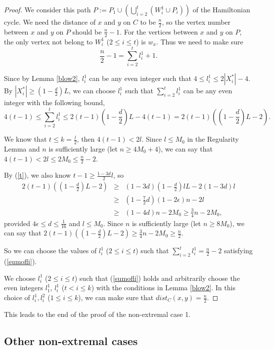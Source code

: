 \documentclass[11pt]{article}
\begin{document}
\begin{proof}
We consider this path $P:=P_1\cup (\bigcup_{i=2}^t (W_i^1\cup P_i))$ of the Hamiltonian cycle. We need the distance of $x$ and $y$ on $C$ to be $\frac{n}{2}$, so the vertex number between $x$ and $y$ on $P$ should be $\frac{n}{2}-1$. For the vertices between $x$ and $y$ on $P$, the only vertex not belong to $W_i^1$ ($2\leq i\leq t$) is $w_x$. Thus we need to make sure
\begin{equation}\label{sumofli}
\frac{n}{2}-1=\sum\limits_{i=2}^{t}l_i^1+1.
\end{equation}

Since by Lemma \ref{blow2}, $l_i^1$ can be any even integer such that $4\leq l_i^1\leq 2|X_i^*|-4$. By $|X_i^*|\geq (1-\frac{d}{2})L$, we can choose $l_i^1$ such that $\sum\limits_{i=2}^{t}l_i^1$ can be any even integer with the following bound,
$$4(t-1)\leq \sum\limits_{i=2}^{t}l_i^1\leq 2(t-1)(1-\frac{d}{2})L-4(t-1)=2(t-1)((1-\frac{d}{2})L-2).$$

We know that $t\leq k=\frac{l}{2}$, then $4(t-1)<2l$. Since $l\leq M_0$ in the Regularity Lemma and $n$ is sufficiently large (let $n\geq 4M_0+4$), we can say that $4(t-1)<2l\leq 2M_0\leq \frac{n}{2}-2$.

By (\ref{t}), we also know $t-1\geq \frac{1-3d}{2}l$, so
\begin{eqnarray*}
2(t-1)((1-\frac{d}{2})L-2)&\geq &(1-3d)(1-\frac{d}{2})lL-2(1-3d)l\\ &\geq &(1-\frac{7}{2}d)(1-2\epsilon )n-2l\\ &\geq &(1-4d)n-2M_0\geq \frac{3}{4}n-2M_0,
\end{eqnarray*}
provided $4\epsilon \leq d\leq \frac{1}{16}$ and $l\leq M_0$. Since $n$ is sufficiently large (let $n\geq 8M_0$), we can say that $2(t-1)((1-\frac{d}{2})L-2)\geq \frac{3}{4}n-2M_0\geq \frac{n}{2}$.

So we can choose the values of $l_i^1$ ($2\leq i\leq t$) such that $\sum\limits_{i=2}^{t}l_i^1=\frac{n}{2}-2$ satisfying (\ref{sumofli}).

We choose $l_i^1$ ($2\leq i\leq t$) such that (\ref{sumofli}) holds and arbitrarily choose the even integers  $l_1^1$, $l_i^1$ ($t<i\leq k$) with the conditions in Lemma \ref{blow2}. In this choice of $l_i^1,l_i^2$ ($1\leq i\leq k$), we can make sure that $dist_C(x,y)=\frac{n}{2}$.
\end{proof}

This leads to the end of the proof of the non-extremal case 1.


\subsection{Other non-extremal cases}
\end{document}
